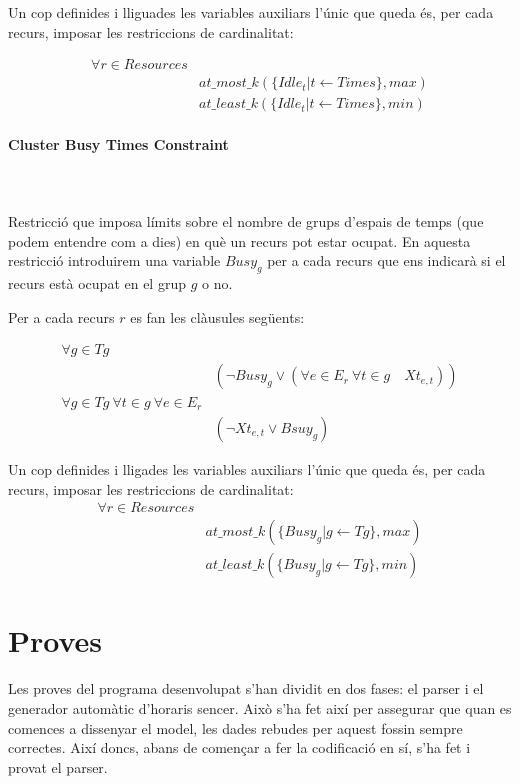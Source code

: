 \documentclass[11pt,a4paper,twoside]{report}
\begin{document}
   Un cop definides i lliguades les variables auxiliars l'únic que queda és, per cada recurs, imposar les restriccions de cardinalitat:

   \begin{align*}
    \forall r \in Resources &\\
    & at\_most\_k(\{ Idle_t | t \leftarrow Times\}, max) \\
    & at\_least\_k(\{ Idle_t | t \leftarrow Times\}, min)
   \end{align*}

  \paragraph*{Cluster Busy Times Constraint} ~\\~\\

  Restricció que imposa límits sobre el nombre de grups d'espais de temps (que podem entendre com a dies) en què un recurs pot estar ocupat. En aquesta restricció introduirem una variable $Busy_g$ per a cada recurs que ens indicarà si el recurs està ocupat en el grup $g$ o no.

  Per a cada recurs $r$ es fan les clàusules següents:
  
  \begin{align*}
    \forall g \in Tg & \\
    &(\neg Busy_g \lor (\forall e \in E_r \ \forall t \in g \quad Xt_{e,t}))\\
    \forall g \in Tg \ \forall t \in g \ \forall e \in E_r &\\
    & (\neg Xt_{e,t} \lor Bsuy_g)
  \end{align*}

  Un cop definides i lligades les variables auxiliars l'únic que queda és, per cada recurs, imposar les restriccions de cardinalitat:
  \begin{align*}
    \forall r \in Resources &\\
    & at\_most\_k(\{ Busy_g | g \leftarrow Tg\}, max) \\
    & at\_least\_k(\{ Busy_g | g \leftarrow Tg\}, min)
   \end{align*}
  


   \section{Proves}

   Les proves del programa desenvolupat s'han dividit en dos fases: el parser i el generador automàtic d'horaris sencer. 
   Això s'ha fet així per assegurar que quan es comences a dissenyar el model, les dades rebudes per aquest fossin sempre correctes. Així doncs, abans de començar a fer la codificació en sí, s'ha fet i provat el parser.
\end{document}
